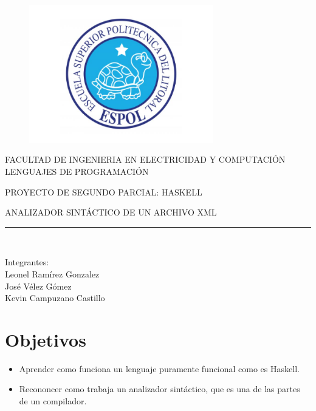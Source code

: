 \documentclass[a4paper,openright,12pt]{report}
\begin{document}
\begin{titlepage}

\begin{center}
\vspace*{-1in}
\begin{figure}[htb]
\begin{center}
\includegraphics[width=8cm]{./imagenes/espol.jpg}
\end{center}
\end{figure}
FACULTAD DE INGENIERIA EN ELECTRICIDAD Y COMPUTACIÓN\\
\vspace*{0.15in}
LENGUAJES DE PROGRAMACIÓN\\
\vspace*{0.6in}
\begin{large}
PROYECTO DE SEGUNDO PARCIAL: HASKELL
\end{large}
\vspace*{0.4in}
\begin{large}
ANALIZADOR SINTÁCTICO DE UN ARCHIVO XML\\
\end{large}
\vspace*{0.3in}
\rule{80mm}{0.1mm}\\
\vspace*{0.1in}
\begin{large}
Integrantes:\\Leonel Ramírez Gonzalez\\José Vélez Gómez\\Kevin Campuzano Castillo\\ 
\end{large}
\end{center}
\end{titlepage}

\tableofcontents
\chapter{Objetivos}
\begin{itemize}
\item {Aprender como funciona un lenguaje puramente funcional como es Haskell.}
\item{Recononcer como trabaja un analizador sintáctico, que es una de las partes de un compilador.}
\end{itemize}
\end{document}
